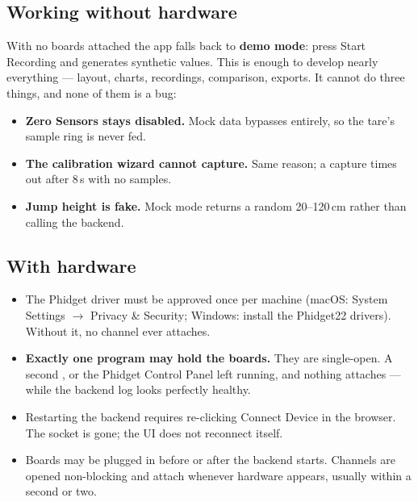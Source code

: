 \documentclass[11pt,a4paper]{article}
\begin{document}
\subsection{Working without hardware}

With no boards attached the app falls back to \textbf{demo mode}: press
\textsf{Start Recording} and  generates synthetic values.
This is enough to develop nearly everything --- layout, charts, recordings,
comparison, exports. It cannot do three things, and none of them is a bug:

\begin{itemize}
  \item \textbf{Zero Sensors stays disabled.} Mock data bypasses
         entirely, so the tare's sample ring is never fed.
  \item \textbf{The calibration wizard cannot capture.} Same reason; a capture
        times out after 8\,s with no samples.
  \item \textbf{Jump height is fake.} Mock mode returns a random 20--120\,cm
        rather than calling the backend.
\end{itemize}

\subsection{With hardware}

\begin{itemize}
  \item The Phidget driver must be approved once per machine (macOS:
        \textsf{System Settings $\rightarrow$ Privacy \& Security}; Windows:
        install the Phidget22 drivers). Without it, no channel ever attaches.
  \item \textbf{Exactly one program may hold the boards.} They are single-open.
        A second , or the Phidget Control Panel left running, and
        nothing attaches --- while the backend log looks perfectly healthy.
  \item Restarting the backend requires re-clicking \textsf{Connect Device} in
        the browser. The socket is gone; the UI does not reconnect itself.
  \item Boards may be plugged in before or after the backend starts. Channels
        are opened non-blocking and attach whenever hardware appears, usually
        within a second or two.
\end{itemize}

\end{document}

